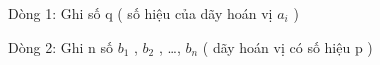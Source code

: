 Dòng 1: Ghi số q ( số hiệu của dãy hoán vị $a_{i}$   )  

   Dòng 2: Ghi n số $b_{1}$   , $b_{2}$   , …, $b_{n}$   ( dãy hoán vị có số hiệu p )